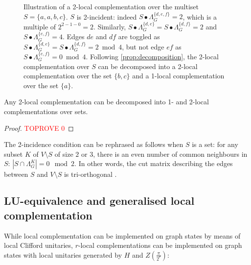 \documentclass[a4paper,UKenglish,cleveref,autoref,thm-restate]{arxiv}
\begin{document}
\begin{figure}[h]
    \caption{Illustration of a 2-local complementation over the multiset $S = \{a,a,b,c\}$. $S$ is 2-incident: indeed $S\bullet \Lambda_G^{\{d,e,f\}} = 2$, which is a multiple of $2^{2-1-0} = 2$. Similarly, $S\bullet \Lambda_G^{\{d,e\}} = S\bullet \Lambda_G^{\{d,f\}} = 2$ and $S\bullet \Lambda_G^{\{e,f\}} = 4$. Edges $de$ and $df$ are toggled as $S\bullet \Lambda_G^{\{d,e\}} = S\bullet \Lambda_G^{\{d,f\}} = 2\bmod 4$, but not edge $ef$ as $S\bullet \Lambda_G^{\{e,f\}} = 0\bmod 4$. Following \cref{prop:decomposition}, the 2-local complementation over $S$ can be decomposed into a 2-local complementation over the set $\{b,c\}$ and a 1-local complementation over the set $\{a\}$.}
    \label{fig:generalized_lc}    
    \end{figure}

\begin{proposition} \label{prop:decomposition}
Any 2-local complementation can be decomposed into 1- and 2-local complementations over sets.
\end{proposition}
\begin{proof}\textcolor{red}{TOPROVE 0}\end{proof}

  
The 2-incidence condition can be rephrased as follows when $S$ is a set: for any subset $K$ of $V\setminus S$ of size $2$ or $3$, there is an even number of common neighbours in $S$: $|S\cap \Lambda_G^K|=0\mod 2$. In other words, the cut matrix describing the edges between $S$ and $V\setminus S$ is tri-orthogonal \cite{bravyi2012magic, shi2024, nezami2022}.  

\subsection{LU-equivalence and generalised local complementation}
 
While local complementation can be implemented on graph states by means of local Clifford unitaries, $r$-local complementations can be implemented on graph states with local unitaries generated by $H$ and $Z\left(\frac \pi {2^r}\right)$:
\end{document}
